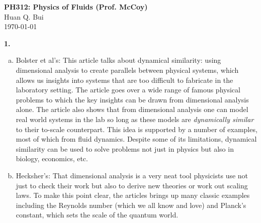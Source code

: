\documentclass[11pt]{article}
\begin{document}
\begin{center}
{\large \bf PH312: Physics of Fluids (Prof. McCoy)}\\
{ Huan Q. Bui}\\
\today
\end{center}
\noindent \textbf{1.}
\begin{enumerate}[(a)]
	\item Bolster et al's: This article talks about dynamical similarity: using dimensional analysis to create parallels between physical systems, which allows us insights into systems that are too difficult to fabricate in the laboratory setting. The article goes over a wide range of famous physical problems to which the key insights can be drawn from dimensional analysis alone. The article also shows that from dimensional analysis one can model real world systems in the lab so long as these models are \textit{dynamically similar} to their to-scale counterpart. This idea is supported by a number of examples, most of which from fluid dynamics. Despite some of its limitations, dynamical similarity can be used to solve problems not just in physics but also in biology, economics, etc. 
 	
	
	
	\item Hecksher's: That dimensional analysis is a very neat tool physicists use not just to check their work but also to derive new theories or work out scaling laws. To make this point clear, the articles brings up many classic examples including the Reynolds number (which we all know and love) and Planck's constant, which sets the scale of the quantum world. 
\end{enumerate}
\end{document}
